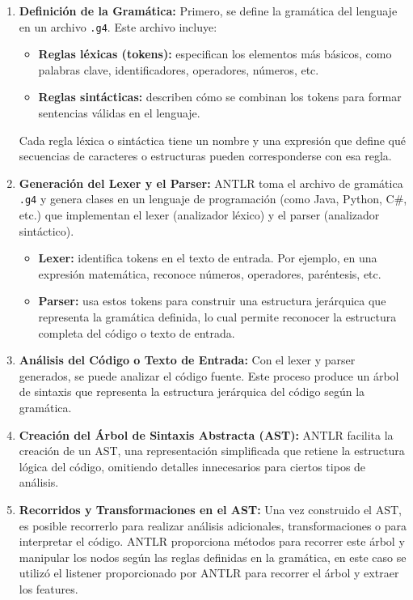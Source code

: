  \begin{enumerate}
    \item \textbf{Definición de la Gramática:}
    Primero, se define la gramática del lenguaje en un archivo \texttt{.g4}. Este archivo incluye:
    \begin{itemize}
        \item \textbf{Reglas léxicas (tokens):} especifican los elementos más básicos, como palabras clave, identificadores, operadores, números, etc.
        \item \textbf{Reglas sintácticas:} describen cómo se combinan los tokens para formar sentencias válidas en el lenguaje.
    \end{itemize}
    Cada regla léxica o sintáctica tiene un nombre y una expresión que define qué secuencias de caracteres o estructuras pueden corresponderse con esa regla.

    \item \textbf{Generación del Lexer y el Parser:}
    ANTLR toma el archivo de gramática \texttt{.g4} y genera clases en un lenguaje de programación (como Java, Python, C\#, etc.) que implementan el lexer (analizador léxico) y el parser (analizador sintáctico).
    \begin{itemize}
        \item \textbf{Lexer:} identifica tokens en el texto de entrada. Por ejemplo, en una expresión matemática, reconoce números, operadores, paréntesis, etc.
        \item \textbf{Parser:} usa estos tokens para construir una estructura jerárquica que representa la gramática definida, lo cual permite reconocer la estructura completa del código o texto de entrada.
    \end{itemize}

    \item \textbf{Análisis del Código o Texto de Entrada:} Con el lexer y parser generados, se puede analizar el código fuente. Este proceso produce un árbol de sintaxis que representa la estructura jerárquica del código según la gramática.

    \item \textbf{Creación del Árbol de Sintaxis Abstracta (AST):} ANTLR facilita la creación de un AST, una representación simplificada que retiene la estructura lógica del código, omitiendo detalles innecesarios para ciertos tipos de análisis.

    \item \textbf{Recorridos y Transformaciones en el AST:} Una vez construido el AST, es posible recorrerlo para realizar análisis adicionales, transformaciones o para interpretar el código. ANTLR proporciona métodos para recorrer este árbol y manipular los nodos según las reglas definidas en la gramática, en este caso se utilizó el listener proporcionado por ANTLR para recorrer el árbol y extraer los features.
\end{enumerate}



